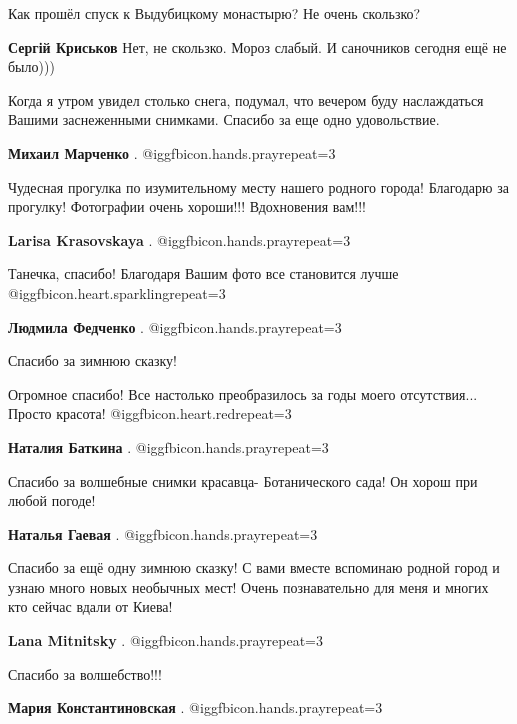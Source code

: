\begin{itemize}
Как прошёл спуск к Выдубицкому монастырю? Не очень скользко?

\textbf{Сергій Криськов} Нет, не скользко. Мороз слабый. И саночников сегодня ещё не было)))


Когда я утром увидел столько снега, подумал, что вечером буду наслаждаться
Вашими заснеженными снимками. Спасибо за еще одно удовольствие.


\textbf{Михаил Марченко} . @igg{fbicon.hands.pray}{repeat=3} 

Чудесная прогулка по изумительному месту нашего родного города! Благодарю за
прогулку! Фотографии очень хороши!!! Вдохновения вам!!!


\textbf{Larisa Krasovskaya} . @igg{fbicon.hands.pray}{repeat=3} 

Танечка, спасибо! Благодаря Вашим фото все становится лучше @igg{fbicon.heart.sparkling}{repeat=3} 

\textbf{Людмила Федченко} . @igg{fbicon.hands.pray}{repeat=3} 

Спасибо за зимнюю сказку!


Огромное спасибо! Все настолько преобразилось за годы моего отсутствия...
Просто красота! @igg{fbicon.heart.red}{repeat=3}

\textbf{Наталия Баткина} . @igg{fbicon.hands.pray}{repeat=3} 

Спасибо за волшебные снимки красавца- Ботанического сада! Он хорош при любой погоде!

\textbf{Наталья Гаевая} . @igg{fbicon.hands.pray}{repeat=3} 


Спасибо за ещё одну зимнюю сказку! С вами вместе вспоминаю родной город и узнаю
много новых необычных мест! Очень познавательно для меня и многих кто сейчас
вдали от Киева!


\textbf{Lana Mitnitsky} . @igg{fbicon.hands.pray}{repeat=3} 

Спасибо за волшебство!!!

\textbf{Мария Константиновская} . @igg{fbicon.hands.pray}{repeat=3} 


\end{itemize}
